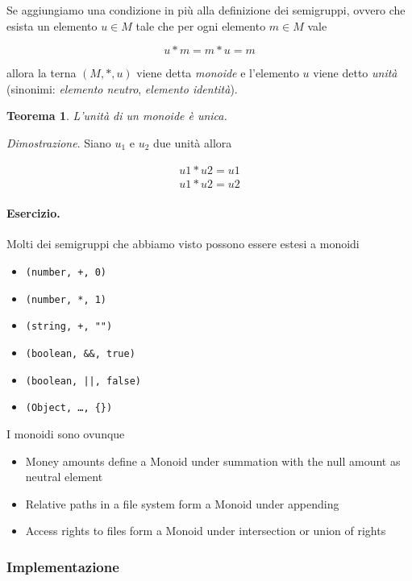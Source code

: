 \documentclass[12pt]{article}
\newtheorem{theorem}{Teorema}
\begin{document}
Se aggiungiamo una condizione in più alla definizione dei semigruppi, ovvero che esista un elemento $u \in M$
tale che per ogni elemento $m \in M$ vale

$$
u * m = m * u = m
$$

allora la terna $(M, *, u)$ viene detta \emph{monoide} e l'elemento $u$ viene detto \emph{unità}
(sinonimi: \emph{elemento neutro}, \emph{elemento identità}).

\begin{theorem}
L'unità di un monoide è unica.
\end{theorem}

\emph{Dimostrazione}. Siano $u_1$ e $u_2$ due unità allora

\begin{eqnarray}
u1 * u2 = u1 \\
u1 * u2 = u2
\end{eqnarray}

\paragraph{Esercizio.} Molti dei semigruppi che abbiamo visto possono essere estesi a monoidi

\begin{itemize}
  \item \texttt{(number, +, 0)}
  \item \texttt{(number, *, 1)}
  \item \texttt{(string, +, "")}
  \item \texttt{(boolean, \&\&, true)}
  \item \texttt{(boolean, ||, false)}
  \item \texttt{(Object, \ldots, \{\})}
\end{itemize}

I monoidi sono ovunque

\begin{itemize}
  \item Money amounts define a Monoid under summation with the null amount as neutral element
  \item Relative paths in a file system form a Monoid under appending
  \item Access rights to files form a Monoid under intersection or union of rights
\end{itemize}

\subsubsection{Implementazione}
\end{document}

